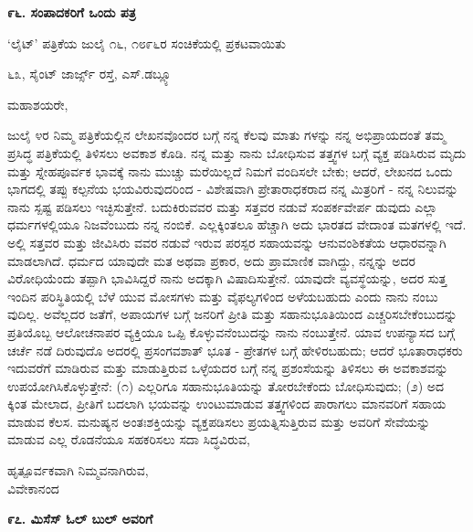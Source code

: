 \begin{center}
\textbf{೯೬. ಸಂಪಾದಕರಿಗೆ ಒಂದು ಪತ್ರ}
\end{center}

\begin{center}
‘ಲೈಟ್’ ಪತ್ರಿಕೆಯ ಜುಲೈ ೧೬, ೧೮೯೬ರ ಸಂಚಿಕೆಯಲ್ಲಿ ಪ್ರಕಟವಾಯಿತು
\end{center}

\begin{flushright}
೬೩, ಸೈಂಟ್ ಜಾರ್ಜ್ಸ್ ರಸ್ತೆ, ಎಸ್.ಡಬ್ಲ್ಯೂ
\end{flushright}

ಮಹಾಶಯರೇ,

ಜುಲೈ ೪ರ ನಿಮ್ಮ ಪತ್ರಿಕೆಯಲ್ಲಿನ ಲೇಖನವೊಂದರ ಬಗ್ಗೆ ನನ್ನ ಕೆಲವು ಮಾತು ಗಳನ್ನು ನನ್ನ ಅಭಿಪ್ರಾಯದಂತೆ ತಮ್ಮ ಪ್ರಸಿದ್ಧ ಪತ್ರಿಕೆಯಲ್ಲಿ ತಿಳಿಸಲು ಅವಕಾಶ ಕೊಡಿ. ನನ್ನ ಮತ್ತು ನಾನು ಬೋಧಿಸುವ ತತ್ತ್ವಗಳ ಬಗ್ಗೆ ವ್ಯಕ್ತ ಪಡಿಸಿರುವ ಮೃದು ಮತ್ತು ಸ್ನೇಹಪೂರ್ವಕ ಭಾವಕ್ಕೆ ನಾನು ಮುಚ್ಚು ಮರೆಯಿಲ್ಲದೆ ನಿಮಗೆ ವಂದಿಸಲೇ ಬೇಕು; ಆದರೆ, ಲೇಖನದ ಒಂದು ಭಾಗದಲ್ಲಿ ತಪ್ಪು ಕಲ್ಪನೆಯ ಭಯವಿರುವುದರಿಂದ - ವಿಶೇಷವಾಗಿ ಪ್ರೇತಾರಾಧಕರಾದ ನನ್ನ ಮಿತ್ರರಿಗೆ - ನನ್ನ ನಿಲುವನ್ನು ನಾನು ಸ್ಪಷ್ಟ ಪಡಿಸಲು ಇಚ್ಛಿಸುತ್ತೇನೆ. ಬದುಕಿರುವವರ ಮತ್ತು ಸತ್ತವರ ನಡುವೆ ಸಂಪರ್ಕವೇರ್ಪ ಡುವುದು ಎಲ್ಲಾ ಧರ್ಮಗಳಲ್ಲಿಯೂ ನಿಜವೆಂಬುದು ನನ್ನ ನಂಬಿಕೆ. ಎಲ್ಲಕ್ಕಿಂತಲೂ ಹೆಚ್ಚಾಗಿ ಅದು ಭಾರತದ ವೇದಾಂತ ಮತಗಳಲ್ಲಿ ಇದೆ. ಅಲ್ಲಿ ಸತ್ತವರ ಮತ್ತು ಜೀವಿಸಿರು ವವರ ನಡುವೆ ಇರುವ ಪರಸ್ಪರ ಸಹಾಯವನ್ನು ಆನುವಂಶಿಕತೆಯ ಆಧಾರವನ್ನಾಗಿ ಮಾಡಲಾಗಿದೆ. ಧರ್ಮದ ಯಾವುದೇ ಮತ ಅಥವಾ ಪ್ರಕಾರ, ಅದು ಪ್ರಾಮಾಣಿಕ ವಾಗಿದ್ದು, ನನ್ನನ್ನು ಅದರ ವಿರೋಧಿಯೆಂದು ತಪ್ಪಾಗಿ ಭಾವಿಸಿದ್ದರೆ ನಾನು ಅದಕ್ಕಾಗಿ ವಿಷಾದಿಸುತ್ತೇನೆ. ಯಾವುದೇ ವ್ಯವಸ್ಥೆಯನ್ನು, ಅದರ ಸುತ್ತ ಇಂದಿನ ಪರಿಸ್ಥಿತಿಯಲ್ಲಿ ಬೆಳೆ ಯುವ ಮೋಸಗಳು ಮತ್ತು ವೈಫಲ್ಯಗಳಿಂದ ಅಳೆಯಬಹುದು ಎಂದು ನಾನು ನಂಬು ವುದಿಲ್ಲ. ಅವೆಲ್ಲದರ ಜತೆಗೆ, ಅಪಾಯಗಳ ಬಗ್ಗೆ ಜನರಿಗೆ ಪ್ರೀತಿ ಮತ್ತು ಸಹಾನುಭೂತಿಯಿಂದ ಎಚ್ಚರಿಸಬೇಕೆಂಬುದನ್ನು ಪ್ರತಿಯೊಬ್ಬ ಆಲೋಚನಾಪರ ವ್ಯಕ್ತಿಯೂ ಒಪ್ಪಿ ಕೊಳ್ಳುವನೆಂಬುದನ್ನು ನಾನು ನಂಬುತ್ತೇನೆ. ಯಾವ ಉಪನ್ಯಾಸದ ಬಗ್ಗೆ ಚರ್ಚೆ ನಡೆ ದಿರುವುದೊ ಅದರಲ್ಲಿ ಪ್ರಸಂಗವಶಾತ್ ಭೂತ - ಪ್ರೇತಗಳ ಬಗ್ಗೆ ಹೇಳಿರಬಹುದು; ಆದರೆ ಭೂತಾರಾಧಕರು ಇದುವರೆಗೆ ಮಾಡಿರುವ ಮತ್ತು ಮಾಡುತ್ತಿರುವ ಒಳ್ಳೆಯದರ ಬಗ್ಗೆ ನನ್ನ ಪ್ರಶಂಸೆಯನ್ನು ತಿಳಿಸಲು ಈ ಅವಕಾಶವನ್ನು ಉಪಯೋಗಿಸಿಕೊಳ್ಳುತ್ತೇನೆ: (೧) ಎಲ್ಲರಿಗೂ ಸಹಾನುಭೂತಿಯನ್ನು ತೋರಬೇಕೆಂದು ಬೋಧಿಸುವುದು; (೨) ಅದ ಕ್ಕಿಂತ ಮೇಲಾದ, ಪ್ರೀತಿಗೆ ಬದಲಾಗಿ ಭಯವನ್ನು ಉಂಟುಮಾಡುವ ತತ್ತ್ವಗಳಿಂದ ಪಾರಾಗಲು ಮಾನವರಿಗೆ ಸಹಾಯ ಮಾಡುವ ಕೆಲಸ. ಮನುಷ್ಯನ ಅಂತಃಶಕ್ತಿಯನ್ನು ವ್ಯಕ್ತಪಡಿಸಲು ಪ್ರಯತ್ನಿಸುತ್ತಿರುವ ಮತ್ತು ಅವರಿಗೆ ಸೇವೆಯನ್ನು ಮಾಡುವ ಎಲ್ಲ ರೊಡನೆಯೂ ಸಹಕರಿಸಲು ಸದಾ ಸಿದ್ಧವಿರುವ,

\begin{flushright}
ಹೃತ್ಪೂರ್ವಕವಾಗಿ ನಿಮ್ಮವನಾಗಿರುವ,\\ವಿವೇಕಾನಂದ
\end{flushright}

\begin{center}
\textbf{೯೭. ಮಿಸೆಸ್ ಓಲ್ ಬುಲ್ ಅವರಿಗೆ}
\end{center}

